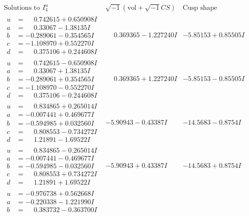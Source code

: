 \documentclass[1p]{elsarticle_modified}
\theoremstyle{definition}
\newcommand{\I}{\sqrt{-1}}
\begin{document}
$$\begin{array}{c|c|c}  
\text{Solutions to }I^u_{4}& \I (\text{vol} + \sqrt{-1}CS) & \text{Cusp shape}\\
 \hline 
\begin{aligned}
u &= \phantom{-}0.742615 + 0.650908 I \\
a &= \phantom{-}0.33067 - 1.38135 I \\
b &= -0.289061 - 0.354565 I \\
c &= -1.108970 + 0.552270 I \\
d &= \phantom{-}0.375106 + 0.244608 I\end{aligned}
 & \phantom{-}0.369365 - 1.227240 I & -5.85153 + 0.85505 I \\ \hline\begin{aligned}
u &= \phantom{-}0.742615 - 0.650908 I \\
a &= \phantom{-}0.33067 + 1.38135 I \\
b &= -0.289061 + 0.354565 I \\
c &= -1.108970 - 0.552270 I \\
d &= \phantom{-}0.375106 - 0.244608 I\end{aligned}
 & \phantom{-}0.369365 + 1.227240 I & -5.85153 - 0.85505 I \\ \hline\begin{aligned}
u &= \phantom{-}0.834865 + 0.265014 I \\
a &= -0.007441 + 0.469677 I \\
b &= -0.594985 + 0.032560 I \\
c &= \phantom{-}0.808553 - 0.734272 I \\
d &= \phantom{-}1.21891 - 1.69522 I\end{aligned}
 & -5.90943 - 0.43387 I & -14.5683 - 0.8754 I \\ \hline\begin{aligned}
u &= \phantom{-}0.834865 - 0.265014 I \\
a &= -0.007441 - 0.469677 I \\
b &= -0.594985 - 0.032560 I \\
c &= \phantom{-}0.808553 + 0.734272 I \\
d &= \phantom{-}1.21891 + 1.69522 I\end{aligned}
 & -5.90943 + 0.43387 I & -14.5683 + 0.8754 I \\ \hline\begin{aligned}
u &= -0.976738 + 0.562668 I \\
a &= -0.220338 - 1.221990 I \\
b &= \phantom{-}0.383732 - 0.363700 I \\

\end{aligned}
\end{array}$$
\end{document}
